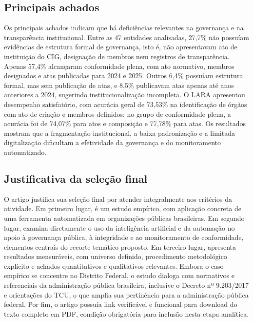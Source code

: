 \documentclass[12pt,a4paper]{article}
\begin{document}
\subsection{Principais achados}
\label{sec:orgfb88c33}

Os principais achados indicam que há deficiências relevantes na governança e na transparência institucional. Entre as 47 entidades analisadas, 27,7\% não possuíam evidências de estrutura formal de governança, isto é, não apresentavam ato de instituição do CIG, designação de membros nem registros de transparência. Apenas 57,4\% alcançaram conformidade plena, com ato normativo, membros designados e atas publicadas para 2024 e 2025. Outros 6,4\% possuíam estrutura formal, mas sem publicação de atas, e 8,5\% publicavam atas apenas até anos anteriores a 2024, sugerindo institucionalização incompleta. O LARA apresentou desempenho satisfatório, com acurácia geral de 73,53\% na identificação de órgãos com ato de criação e membros definidos; no grupo de conformidade plena, a acurácia foi de 74,07\% para atos e composição e 77,78\% para atas. Os resultados mostram que a fragmentação institucional, a baixa padronização e a limitada digitalização dificultam a efetividade da governança e do monitoramento automatizado.

\subsection{Justificativa da seleção final}
\label{sec:org5dd8fa9}

O artigo justifica sua seleção final por atender integralmente aos critérios da atividade. Em primeiro lugar, é um estudo empírico, com aplicação concreta de uma ferramenta automatizada em organizações públicas brasileiras. Em segundo lugar, examina diretamente o uso da inteligência artificial e da automação no apoio à governança pública, à integridade e ao monitoramento de conformidade, elementos centrais do recorte temático proposto. Em terceiro lugar, apresenta resultados mensuráveis, com universo definido, procedimento metodológico explícito e achados quantitativos e qualitativos relevantes. Embora o caso empírico se concentre no Distrito Federal, o estudo dialoga com normativos e referenciais da administração pública brasileira, inclusive o Decreto nº 9.203/2017 e orientações do TCU, o que amplia sua pertinência para a administração pública federal. Por fim, o artigo possuía link verificável e funcional para download do texto completo em PDF, condição obrigatória para inclusão nesta etapa analítica.
\end{document}
